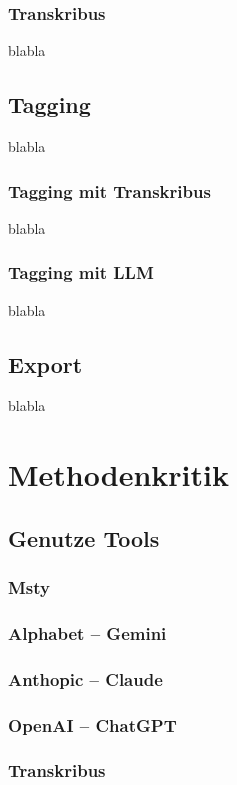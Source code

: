 \documentclass[12pt, a4paper, ngerman, bidi=default]{article}
\begin{document}
\subsubsection{Transkribus}
blabla
\subsection{Tagging}
blabla
\subsubsection{Tagging mit Transkribus}
blabla
\subsubsection{Tagging mit LLM}
blabla
\subsection{Export}
blabla
\section{Methodenkritik}
\subsection{Genutze Tools}
\subsubsection{Msty}
\subsubsection{Alphabet -- Gemini}
\subsubsection{Anthopic -- Claude}
\subsubsection{OpenAI -- ChatGPT}
\subsubsection{Transkribus}
\end{document}
